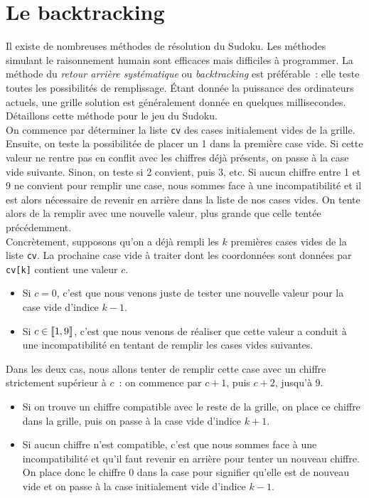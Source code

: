 \documentclass{magnolia}
\begin{document}
\section{Le backtracking}

Il existe de nombreuses méthodes de résolution du Sudoku. Les méthodes simulant le raisonnement humain sont efficaces mais difficiles à programmer. La méthode du \emph{retour arrière systématique} ou \emph{backtracking} est préférable~: elle teste
toutes les possibilités de remplissage. Étant donnée la puissance des ordinateurs actuels, une grille solution est généralement  donnée en quelques millisecondes. Détaillons cette
méthode pour le jeu du Sudoku.\\

On commence par déterminer la liste \verb!cv! des cases initialement vides de la grille.
Ensuite, on teste
la possibilitée de placer un 1 dans la première case vide. Si cette valeur ne rentre
pas en conflit avec les chiffres déjà présents, on passe à la case vide suivante.
Sinon, on teste si 2 convient, puis 3, etc. Si aucun chiffre entre 1 et 9 ne convient
pour remplir une case, nous sommes face à une incompatibilité et il est alors
nécessaire de revenir en arrière dans la liste de nos cases vides. On tente alors de
la remplir avec une nouvelle valeur, plus grande que celle tentée précédemment.\\

Concrètement, supposons qu'on a déjà rempli les $k$ premières cases vides de la liste
\verb!cv!. La prochaine case vide à traiter dont les coordonnées sont données par
\verb!cv[k]! contient une valeur $c$.
\begin{itemize}
\item Si $c=0$, c'est que nous venons juste de tester une nouvelle valeur pour la
  case vide d'indice $k-1$.
\item Si $c\in\left\llbracket 1,9\right\rrbracket$, c'est que nous venons de réaliser que cette
  valeur a conduit à une incompatibilité en tentant de remplir les cases vides
  suivantes. 
\end{itemize}
\medskip

Dans les deux cas, nous allons tenter de remplir cette case avec un chiffre
strictement supérieur à $c$~: on commence par $c+1$, puis $c+2$, jusqu'à 9.
\begin{itemize}
\item Si on trouve un chiffre compatible avec le reste de la grille, on place
  ce chiffre dans la grille, puis on passe à la case vide d'indice $k+1$.
\item Si aucun chiffre n'est compatible, c'est que nous sommes face à une incompatibilité
  et qu'il faut revenir en arrière pour tenter un nouveau chiffre. On place donc
  le chiffre 0 dans la case pour signifier qu'elle est de nouveau vide et on passe à la case
  initialement vide d'indice $k-1$.
\end{itemize}
\medskip
\end{document}
